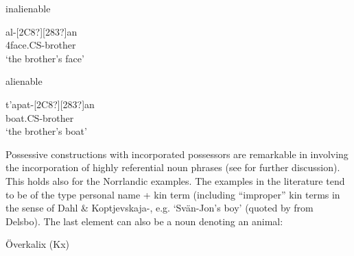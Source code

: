 \item 

inalienable



 \ea\label{}
\gll [127?]al-[2C8?][283?]an\\


4face.CS-brother\\

\glt ‘the brother’s face’  

\z

\item 

alienable



 \ea\label{}
\gll t’apat-[2C8?][283?]an\\


boat.CS-brother\\

\glt ‘the brother’s boat’

\z

Possessive constructions with incorporated possessors are remarkable in involving the incorporation of highly referential noun phrases (see \citet{Dahl2004} for further discussion). This holds also for the Norrlandic examples. The examples in the literature tend to be of the type personal name + kin term (including “improper” kin terms in the sense of Dahl \& Koptjevskaja-\citet{Tamm2001}, e.g.  ‘Svän-Jon’s boy’ (quoted by \citet[38]{Delsing2003a} from Delsbo). The last element can also be a noun denoting an animal:


\item 

Överkalix (Kx)

